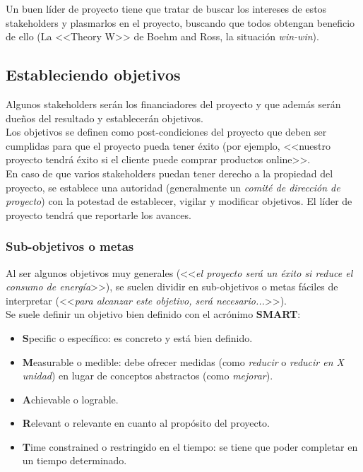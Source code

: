 \documentclass[12pt]{article}
\begin{document}
{Un buen líder de proyecto tiene que tratar de buscar los intereses de estos stakeholders y plasmarlos en el proyecto, buscando que todos obtengan beneficio de ello (La <<Theory W>> de Boehm and Ross, la situación \textit{win-win}).}

\subsection{Estableciendo objetivos}
\label{1.10.0}

{Algunos stakeholders serán los financiadores del proyecto y que además serán dueños del resultado y establecerán objetivos.}\\

{Los objetivos se definen como post-condiciones del proyecto que deben ser cumplidas para que el proyecto pueda tener éxito (por ejemplo, <<nuestro proyecto tendrá éxito si el cliente puede comprar productos online>>.}\\

{En caso de que varios stakeholders puedan tener derecho a la propiedad del proyecto, se establece una autoridad (generalmente un \textit{comité de dirección de proyecto}) con la potestad de establecer, vigilar y modificar objetivos. El líder de proyecto tendrá que reportarle los avances.}

\subsubsection{Sub-objetivos o metas}
\label{1.10.1}

{Al ser algunos objetivos muy generales (<<\textit{el proyecto será un éxito si reduce el consumo de energía}>>), se suelen dividir en sub-objetivos o metas fáciles de interpretar (<<\textit{para alcanzar este objetivo, será necesario...}>>).}\\

{Se suele definir un objetivo bien definido con el acrónimo \textbf{SMART}:}
\begin{itemize}
    \item {\textbf{S}pecific o específico: es concreto y está bien definido.}
    \item {\textbf{M}easurable o medible: debe ofrecer medidas (como \textit{reducir} o \textit{reducir en X unidad}) en lugar de conceptos abstractos (como \textit{mejorar}).}
    \item {\textbf{A}chievable o lograble.}
    \item {\textbf{R}elevant o relevante en cuanto al propósito del proyecto.}
    \item {\textbf{T}ime constrained o restringido en el tiempo: se tiene que poder completar en un tiempo determinado.}
\end{itemize}
\end{document}
